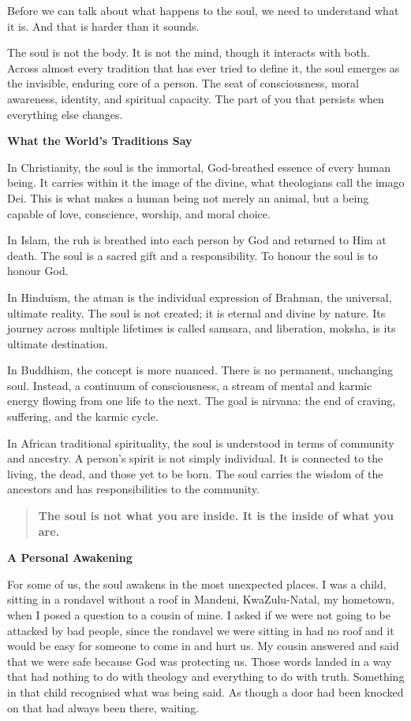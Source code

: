 Before we can talk about what happens to the soul, we need to understand
what it is. And that is harder than it sounds.

The soul is not the body. It is not the mind, though it interacts with
both. Across almost every tradition that has ever tried to define it,
the soul emerges as the invisible, enduring core of a person. The seat
of consciousness, moral awareness, identity, and spiritual capacity. The
part of you that persists when everything else changes.

\textbf{What the World's Traditions Say}

In Christianity, the soul is the immortal, God-breathed essence of every
human being. It carries within it the image of the divine, what
theologians call the imago Dei. This is what makes a human being not
merely an animal, but a being capable of love, conscience, worship, and
moral choice.

In Islam, the ruh is breathed into each person by God and returned to
Him at death. The soul is a sacred gift and a responsibility. To honour
the soul is to honour God.

In Hinduism, the atman is the individual expression of Brahman, the
universal, ultimate reality. The soul is not created; it is eternal and
divine by nature. Its journey across multiple lifetimes is called
samsara, and liberation, moksha, is its ultimate destination.

In Buddhism, the concept is more nuanced. There is no permanent,
unchanging soul. Instead, a continuum of consciousness, a stream of
mental and karmic energy flowing from one life to the next. The goal is
nirvana: the end of craving, suffering, and the karmic cycle.

In African traditional spirituality, the soul is understood in terms of
community and ancestry. A person's spirit is not simply individual. It
is connected to the living, the dead, and those yet to be born. The soul
carries the wisdom of the ancestors and has responsibilities to the
community.

\begin{quote}
\textbf{The soul is not what you are inside. It is the inside of what
you are.}
\end{quote}

\textbf{A Personal Awakening}

For some of us, the soul awakens in the most unexpected places. I was a
child, sitting in a rondavel without a roof in Mandeni, KwaZulu-Natal,
my hometown, when I posed a question to a cousin of mine. I asked if we
were not going to be attacked by bad people, since the rondavel we were
sitting in had no roof and it would be easy for someone to come in and
hurt us. My cousin answered and said that we were safe because God was
protecting us. Those words landed in a way that had nothing to do with
theology and everything to do with truth. Something in that child
recognised what was being said. As though a door had been knocked on
that had always been there, waiting.

